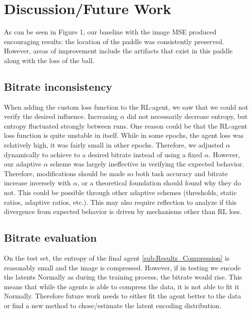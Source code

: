 \section{Discussion/Future Work}
As can be seen in Figure 1, our baseline with the image MSE produced encouraging
results: the location of the paddle was consistently preserved. However, areas
of improvement include the artifacts that exist in this paddle along with the
loss of the ball.
\subsection{Bitrate inconsistency}
When adding the custom loss function to the RL-agent, we saw that we could not verify the desired influence. Increasing $\alpha$ did not necessarily decrease
entropy, but entropy fluctuated strongly between runs. One
reason could be that the RL-agent loss function is quite
unstable in itself. While in some epochs, the agent loss was relatively high, it was fairly small in
other epochs. Therefore, we adjusted $\alpha$
dynamically to achieve to a desired bitrate instead of using a fixed $\alpha$.
However, our adaptive $\alpha$ scheme was largely ineffective in verifying the
expected behavior. Therefore, modifications should be made so both task
accuracy and bitrate increase inversely with $\alpha$, or a theoretical
foundation should found why they do not. This could be possible through other
adaptive schemes (thresholds, static ratios, adaptive ratios, etc.). This may
also require reflection to analyze if this divergence from expected behavior is
driven by mechanisms other than RL loss.
\subsection{Bitrate evaluation}
On the test set, the entropy of the final agent \ref{sub:Results_Compression} is
reasonably small and the image is compressed. However, if in testing we encode
the latents Normally as during the training process, the
bitrate would rise. This means that while the agents is able to
compress the data, it is not able to fit it Normally.
Therefore future work needs to either fit the agent better to the data or find
a new method to chose/estimate the latent encoding distribution.

